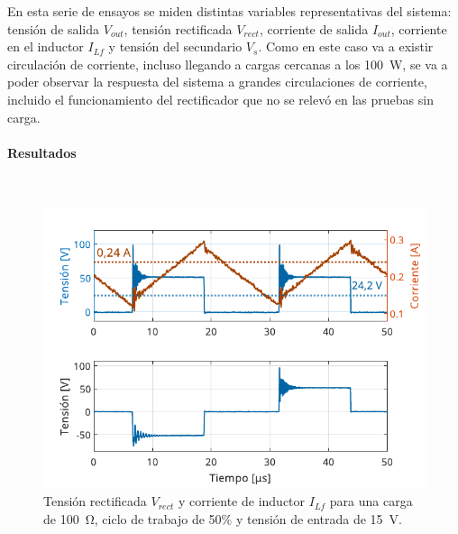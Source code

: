 En esta serie de ensayos se miden distintas variables representativas del sistema: tensión de salida $V_{out}$, tensión rectificada $V_{rect}$, corriente de salida $I_{out}$, corriente en el inductor $I_{Lf}$ y tensión del secundario $V_s$. Como en este caso va a existir circulación de corriente, incluso llegando a cargas cercanas a los \SI[]{100}{\watt}, se va a poder observar la respuesta del sistema a grandes circulaciones de corriente, incluido el funcionamiento del rectificador que no se relevó en las pruebas sin carga.\\

\paragraph{Resultados}

\lipsum[2]\\

\begin{figure}[h]
    \centering
    \includegraphics[scale=1]{Imagenes/Con Carga - Caso 1.pdf}
    \caption{Tensión rectificada $V_{rect}$ y corriente de inductor $I_{Lf}$ para una carga de \SI[]{100}{\ohm}, ciclo de trabajo de 50\% y tensión de entrada de \SI[]{15}{\volt}.}
    \label{ConCargaI}
\end{figure}

\lipsum[3]\\